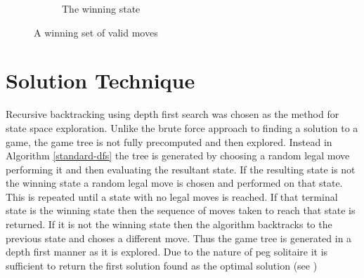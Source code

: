 \documentclass[12pt,a4paper]{report}
\begin{document}
\begin{figure}[ht]
\begin{subfigure}[t]{0.3\textwidth}
{      
    }
    \caption{The winning state}
  \end{subfigure}
  \caption{A winning set of valid moves}
\end{figure}
\pagebreak
\section*{Solution Technique}
Recursive backtracking using depth first search was chosen as the method for state space exploration. Unlike the brute force approach to finding a solution to a game, the game tree is not fully precomputed and then explored. Instead in Algorithm \ref{standard-dfs} the tree is generated by choosing a random legal move performing it and then evaluating the resultant state. If the resulting state is not the winning state a random legal move is chosen and performed on that state. This is repeated until a state with no legal moves is reached. If that terminal state is the winning state then the sequence of moves taken to reach that state is returned. If it is not the winning state then the algorithm backtracks to the previous state and choses a different move. Thus the game tree is generated in a depth first manner as it is explored. Due to the nature of peg solitaire it is sufficient to return the first solution found as the optimal solution (see )
\end{document}
